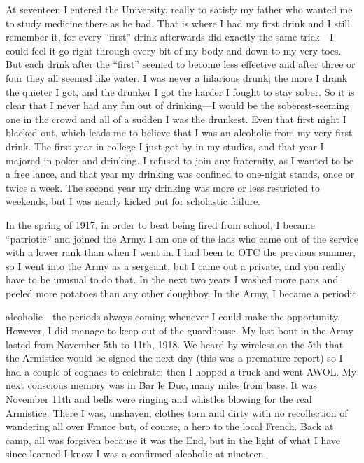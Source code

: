 At seventeen I entered the University, really to satisfy my father who wanted me to study medicine there as he had. That is where I had my first drink and I still remember it, for every “first” drink afterwards did exactly the same trick—I could feel it go right through every bit of my body and down to my very toes. But each drink after the “first” seemed to become less effective and after three or four they all seemed like water. I was never a hilarious drunk; the more I drank the quieter I got, and the drunker I got the harder I fought to stay sober. So it is clear that I never had any fun out of drinking—I would be the soberest-seeming one in the crowd and all of a sudden I was the drunkest. Even that first night I blacked out, which leads me to believe that I was an alcoholic from my very first drink. The first year in college I just got by in my studies, and that year I majored in poker and drinking. I refused to join any fraternity, as I wanted to be a free lance, and that year my drinking was confined to one-night stands, once or twice a week. The second year my drinking was more or less restricted to weekends, but I was nearly kicked out for scholastic failure.

In the spring of 1917, in order to beat being fired from school, I became “patriotic” and joined the Army. I am one of the lads who came out of the service with a lower rank than when I went in. I had been to OTC the previous summer, so I went into the Army as a sergeant, but I came out a private, and you really have to be unusual to do that. In the next two years I washed more pans and peeled more potatoes than any other doughboy. In the Army, I became a periodic

alcoholic—the periods always coming whenever I could make the opportunity. However, I did manage to keep out of the guardhouse. My last bout in the Army lasted from November 5th to 11th, 1918. We heard by wireless on the 5th that the Armistice would be signed the next day (this was a premature report) so I had a couple of cognacs to celebrate; then I hopped a truck and went AWOL. My next conscious memory was in Bar le Duc, many miles from base. It was November 11th and bells were ringing and whistles blowing for the real Armistice. There I was, unshaven, clothes torn and dirty with no recollection of wandering all over France but, of course, a hero to the local French. Back at camp, all was forgiven because it was the End, but in the light of what I have since learned I know I was a confirmed alcoholic at nineteen.

